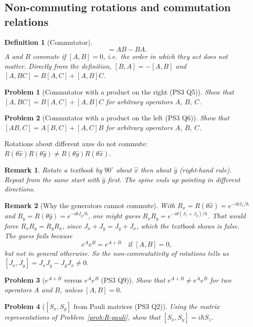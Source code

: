 \documentclass{article}
\newtheorem{definition}{Definition}
\newtheorem{problem}{Problem}
\newtheorem{remark}{Remark}
\begin{document}
\subsection{Non-commuting rotations and commutation relations}
\begin{definition}[Commutator]
    \begin{equation}
        [A,B] = AB - BA.
    \end{equation}
    $A$ and $B$ commute if $[A,B] = 0$, i.e.\ the order in which they act does not matter. Directly from the definition, $[B,A] = -[A,B]$ and $[A,BC] = B[A,C] + [A,B]C$.
\end{definition}
\begin{problem}[Commutator with a product on the right (PS3 Q5)]
    Show that $[A,BC] = B[A,C] + [A,B]C$ for arbitrary operators $A$, $B$, $C$.
\end{problem}
\begin{problem}[Commutator with a product on the left (PS3 Q6)]
    Show that $[AB,C] = A[B,C] + [A,C]B$ for arbitrary operators $A$, $B$, $C$.
\end{problem}
Rotations about different axes do not commute: $R(\theta\hat{x})R(\theta\hat{y}) \neq R(\theta\hat{y})R(\theta\hat{x})$.
\begin{remark}
    Rotate a textbook by $90^\circ$ about $\hat{x}$ then about $\hat{y}$ (right-hand rule). Repeat from the same start with $\hat{y}$ first. The spine ends up pointing in different directions.
\end{remark}
\begin{remark}[Why the generators cannot commute]
    With $R_x = R(\theta\hat{x}) = e^{-i\theta J_x/\hbar}$ and $R_y = R(\theta\hat{y}) = e^{-i\theta J_y/\hbar}$, one might guess $R_xR_y = e^{-i\theta(J_x+J_y)/\hbar}$. That would force $R_xR_y = R_yR_x$, since $J_x + J_y = J_y + J_x$, which the textbook shows is false. The guess fails because
    \begin{equation}
        e^{A}e^{B} = e^{A+B} \quad \text{if } [A,B] = 0,
    \end{equation}
    but not in general otherwise. So the non-commutativity of rotations tells us $[J_x,J_y] = J_xJ_y - J_yJ_x \neq 0$.
\end{remark}
\begin{problem}[$e^{A+B}$ versus $e^Ae^B$ (PS3 Q9)]
    Show that $e^{A+B} \neq e^Ae^B$ for two operators $A$ and $B$, unless $[A,B] = 0$.
\end{problem}
\begin{problem}[{$[S_x,S_y]$ from Pauli matrices (PS3 Q2)}]
    \label{prob:SxSy}
    Using the matrix representations of Problem~\ref{prob:R-pauli}, show that $[S_x,S_y] = i\hbar S_z$.
\end{problem}
\end{document}
